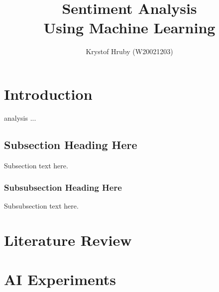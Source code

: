 \documentclass[12pt,journal,compsoc]{IEEEtran}
\begin{document}
\title{Sentiment Analysis\\Using Machine Learning}

\author{Krystof Hruby (W20021203)}





\maketitle

\IEEEdisplaynotcompsoctitleabstractindextext

\IEEEpeerreviewmaketitle


\section{Introduction}

 analysis ...



\subsection{Subsection Heading Here}
Subsection text here.

\subsubsection{Subsubsection Heading Here}
Subsubsection text here.


\section{Literature Review}


\section{AI Experiments}
\end{document}
